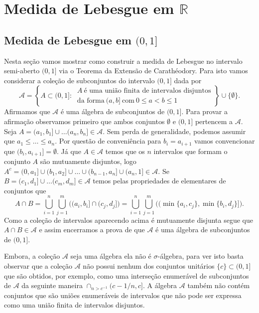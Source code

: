 \chapter[Aula 3]{Medida de Lebesgue em $\mathbb{R}$}
\chaptermark{}








\section{Medida de Lebesgue em $(0,1]$}


Nesta seção vamos mostrar como construir 
a medida de Lebesgue no 
intervalo semi-aberto $(0,1]$ via o Teorema 
da Extensão de Carathéodory. 
Para isto 
vamos considerar a coleção de 
subconjuntos do intervalo $(0,1]$ dada por 
\[
\mathcal{A}
=
\left\{ 
A\subset (0,1]:\ 
\begin{array}{c}
A\
\text{é uma união finita de intervalos disjuntos}
\\
\text{da forma}\ (a,b]
\ \text{com}\ 0\leq a<b\leq 1
\end{array}
\right\}
\cup
\{\emptyset\}.
\]
Afirmamos que $\mathcal{A}$ é uma álgebra de subconjuntos 
de $(0,1]$.
Para provar a afirmação observamos 
primeiro que ambos conjuntos $\emptyset$ e $(0,1]$ pertencem
a $\mathcal{A}$.  
Seja $A=(a_1,b_1]\cup\ldots (a_n,b_n]\in\mathcal{A}$. 
Sem perda de generalidade, podemos assumir que 
$a_1\leq \ldots \leq a_n$.
Por questão de conveniência 
para $b_i=a_{i+1}$
vamos convencionar que $(b_i,a_{i+1}]=\emptyset$. 
Já que $A\in\mathcal{A}$ 
temos que os $n$ intervalos que formam o conjunto 
$A$ são mutuamente disjuntos, logo
$
A^c=(0,a_1]\cup(b_1,a_2]
\cup\ldots\cup (b_{n-1},a_n]\cup (a_n,1] 
\in\mathcal{A}.
$
Se $B=(c_1,d_1]\cup\ldots (c_m,d_m]\in\mathcal{A}$
temos pelas propriedades de elementares de conjuntos
que 
\[
A\cap B
=
\bigcup_{i=1}^n \bigcup_{j=1}^{m}
\Big( (a_i,b_i]\cap (c_j,d_j] \Big)
=
\bigcup_{i=1}^n \bigcup_{j=1}^{m}
\Big( (\min\{a_i,c_j\},\min\{b_i,d_j\}] \Big).
\]
Como a coleção de intervalos aparecendo acima é
mutuamente disjunta segue que $A\cap B\in \mathcal{A}$
e assim encerramos a prova de que $\mathcal{A}$ 
é uma álgebra de subconjuntos de $(0,1]$.

Embora, a coleção $\mathcal{A}$ seja uma álgebra
ela não é $\sigma$-álgebra, para ver isto basta 
observar que a coleção $\mathcal{A}$ não possui 
nenhum dos conjuntos unitários $\{c\}\subset (0,1]$
que são obtidos, por exemplo, como uma interseção 
enumerável de subconjuntos de $\mathcal{A}$ da seguinte maneira
$\cap_{n>c^{-1}} (c-1/n,c]$.
A álgebra $\mathcal{A}$ também não contém conjuntos que 
são uniões enumeráveis de intervalos que não pode ser 
expressa como uma união finita de intervalos disjuntos.


